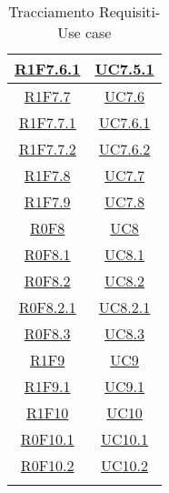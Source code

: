\begin{longtable}{|c|c|}
\hline
\hyperlink{R1F7.6.1}{R1F7.6.1} & \hyperlink{UC7.5.1}{UC7.5.1}\\
\hline
\hyperlink{R1F7.7}{R1F7.7} & \hyperlink{UC7.6}{UC7.6}\\
\hline
\hyperlink{R1F7.7.1}{R1F7.7.1} & \hyperlink{UC7.6.1}{UC7.6.1}\\
\hline
\hyperlink{R1F7.7.2}{R1F7.7.2} & \hyperlink{UC7.6.2}{UC7.6.2}\\
\hline
\hyperlink{R1F7.8}{R1F7.8} & \hyperlink{UC7.7}{UC7.7}\\
\hline
\hyperlink{R1F7.9}{R1F7.9} & \hyperlink{UC7.8}{UC7.8}\\
\hline
\hyperlink{R0F8}{R0F8} & \hyperlink{UC8}{UC8}\\
\hline
\hyperlink{R0F8.1}{R0F8.1} & \hyperlink{UC8.1}{UC8.1}\\
\hline
\hyperlink{R0F8.2}{R0F8.2} & \hyperlink{UC8.2}{UC8.2}\\
\hline
\hyperlink{R0F8.2.1}{R0F8.2.1} & \hyperlink{UC8.2.1}{UC8.2.1}\\
\hline
\hyperlink{R0F8.3}{R0F8.3} & \hyperlink{UC8.3}{UC8.3}\\
\hline
\hyperlink{R1F9}{R1F9} & \hyperlink{UC9}{UC9}\\
\hline
\hyperlink{R1F9.1}{R1F9.1} & \hyperlink{UC9.1}{UC9.1}\\
\hline
\hyperlink{R1F10}{R1F10} & \hyperlink{UC10}{UC10}\\
\hline
\hyperlink{R0F10.1}{R0F10.1} & \hyperlink{UC10.1}{UC10.1}\\
\hline
\hyperlink{R0F10.2}{R0F10.2} & \hyperlink{UC10.2}{UC10.2}\\
\hline
\caption[Tracciamento Requisiti-Use case]{Tracciamento Requisiti-Use case}
\label{tabella:requi-usecase}
\end{longtable}
\clearpage
\normalsize

